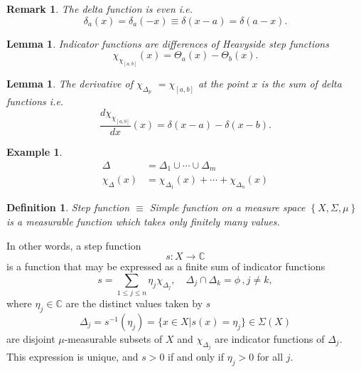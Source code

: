 \documentclass[aps,preprint]{revtex4}%
\providecommand{\U}[1]{\protect\rule{.1in}{.1in}}
\newtheorem{definition}[theorem]{Definition}
\newtheorem{example}[theorem]{Example}
\newtheorem{lemma}[theorem]{Lemma}
\newtheorem{remark}[theorem]{Remark}
\begin{document}
\begin{remark}
The delta function is even i.e.
\begin{equation}
\delta_{a}\left(  x\right)  =\delta_{a}\left(  -x\right)  \equiv\delta\left(
x-a\right)  =\delta\left(  a-x\right)  .
\end{equation}

\end{remark}

\begin{lemma}
\emph{Indicator functions} are differences of Heavyside step functions%
\begin{equation}
\chi_{\chi_{\left[  a,b\right]  }}\left(  x\right)  =\Theta_{a}\left(
x\right)  -\Theta_{b}\left(  x\right)  .
\end{equation}

\end{lemma}

\begin{lemma}
The derivative of $\chi_{\Delta_{p}}$ $=\chi_{\left[  a,b\right]  }$ at the
point $x$ is the sum of delta functions i.e.
\begin{equation}
\frac{d\chi_{\chi_{\left[  a,b\right]  }}}{dx}\left(  x\right)  =\delta\left(
x-a\right)  -\delta\left(  x-b\right)  .
\end{equation}

\end{lemma}

\begin{example}%
\begin{align}
\Delta &  =\Delta_{1}\cup\cdots\cup\Delta_{m}\\
\chi_{\Delta}\left(  x\right)   &  =\chi_{\Delta_{1}}\left(  x\right)
+\cdots+\chi_{\Delta_{n}}\left(  x\right)
\end{align}

\end{example}

\begin{definition}
\emph{Step function }$\equiv$ \emph{Simple function} on a measure space
$\left\{  X,\Sigma,%
\mu
\right\}  $ is a measurable function which takes only finitely many values.
\end{definition}

In other words, a step function%
\begin{equation}
s:X\rightarrow\mathbb{C}%
\end{equation}
is a function that may be expressed as a finite sum of indicator functions
\begin{equation}
s=\sum_{1\leq j\leq n}\eta_{j}\chi_{\Delta_{j}},\quad\Delta_{j}\cap\Delta
_{k}=\phi\,,j\neq k,
\end{equation}
where $\eta_{j}\in\mathbb{C}$ are the distinct values taken by $s$
\begin{equation}
\Delta_{j}=s^{-1}\left(  \eta_{j}\right)  =\{x\in X|s(x)=\eta_{j}\}\in
\Sigma\left(  X\right)
\end{equation}
are disjoint $\mu$-measurable subsets of $X$ and $\chi_{\Delta_{j}}$ are
indicator functions of $\Delta_{j}$. This expression is unique, and $s>0$ if
and only if $\eta_{j}>0$ for all $j$.
\end{document}

